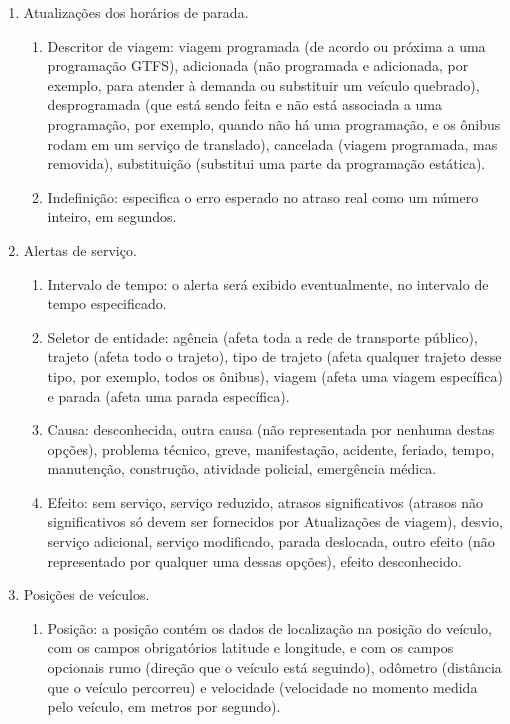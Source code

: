 \documentclass[
	12pt,				%
	oneside,			%
	a4paper,			%
	english,			%
	brazil				%
	]{abntex2ppgsi}
\begin{document}
\begin{enumerate}
\item Atualizações dos horários de parada.
\begin{enumerate}
\item Descritor de viagem: viagem programada (de acordo ou próxima a uma programação GTFS), adicionada (não programada e adicionada, por exemplo, para atender à demanda ou substituir um veículo quebrado), desprogramada (que está sendo feita e não está associada a uma programação, por exemplo, quando não há uma programação, e os ônibus rodam em um serviço de translado), cancelada (viagem programada, mas removida), substituição (substitui uma parte da programação estática).
\item Indefinição: especifica o erro esperado no atraso real como um número inteiro, em segundos.
\end{enumerate}
\item Alertas de serviço.
\begin{enumerate}
\item Intervalo de tempo: o alerta será exibido eventualmente, no intervalo de tempo especificado.
\item Seletor de entidade: agência (afeta toda a rede de transporte público), trajeto (afeta todo o trajeto), tipo de trajeto (afeta qualquer trajeto desse tipo, por exemplo, todos os ônibus), viagem (afeta uma viagem específica) e  parada (afeta uma parada específica).
\item Causa: desconhecida, outra causa (não representada por nenhuma destas opções), problema técnico, greve, manifestação, acidente, feriado, tempo, manutenção, construção, atividade policial, emergência médica.
\item Efeito: sem serviço, serviço reduzido, atrasos significativos (atrasos não significativos só devem ser fornecidos por Atualizações de viagem), desvio, serviço adicional, serviço modificado, parada deslocada, outro efeito (não representado por qualquer uma dessas opções), efeito desconhecido.
\end{enumerate}
\item Posições de veículos.
\begin{enumerate}
\item Posição: a posição contém os dados de localização na posição do veículo, com os campos obrigatórios latitude e longitude, e com os campos opcionais rumo (direção que o veículo está seguindo), odômetro (distância que o veículo percorreu) e velocidade (velocidade no momento medida pelo veículo, em metros por segundo).

\end{enumerate}
\end{enumerate}
\end{document}
